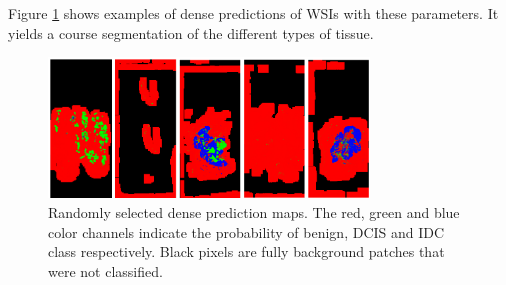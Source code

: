 \documentclass[journal]{IEEEtran}
\begin{document}
Figure \ref{fig_wsi_examples} shows examples of dense predictions of WSIs with these parameters. It yields a course segmentation of the different types of tissue.


\begin{figure}[h]
\centering{}
\hspace{0.09cm}\includegraphics[width=3.35in]{wsi_predictions_examples}
\vspace{-0.15cm}\caption{Randomly selected dense prediction maps. The red, green and blue color channels indicate the probability of benign, DCIS and IDC class respectively. Black pixels are fully background patches that were not classified.}
\label{fig_wsi_examples}
\end{figure}









%
%

\end{document}
